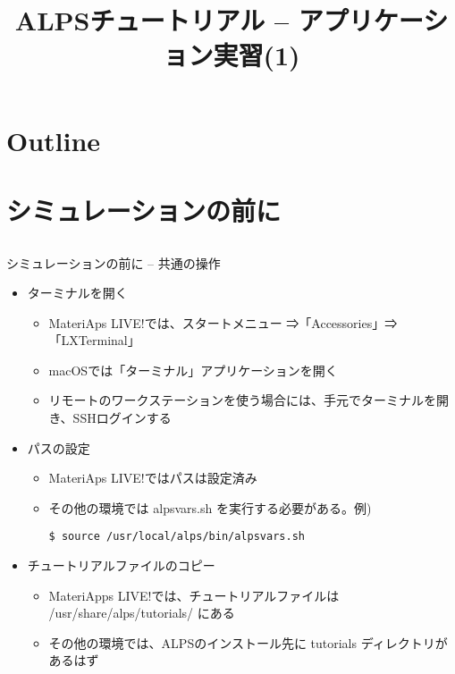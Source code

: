 
\title{ALPSチュートリアル -- アプリケーション実習(1)}




\begin{frame}
  \titlepage
\end{frame}

\section*{Outline}
\begin{frame}[t,fragile]
   \tableofcontents
\end{frame}

\section{シミュレーションの前に}
\subsection*{\redb\whiteb\greenm}

\begin{frame}[t,fragile]{シミュレーションの前に -- 共通の操作}
  \begin{itemize}
  \item ターミナルを開く
    \begin{itemize}
    \item \alert{MateriAps LIVE!では、スタートメニュー ⇒「Accessories」⇒「LXTerminal」}
    \item macOSでは「ターミナル」アプリケーションを開く
    \item リモートのワークステーションを使う場合には、手元でターミナルを開き、SSHログインする
    \end{itemize}

  \item パスの設定
    \begin{itemize}
    \item \alert{MateriAps LIVE!ではパスは設定済み}
    \item その他の環境では alpsvars.sh を実行する必要がある。例)
\begin{lstlisting}
$ source /usr/local/alps/bin/alpsvars.sh
\end{lstlisting}
    \end{itemize}
    
  \item チュートリアルファイルのコピー
    \begin{itemize}
    \item \alert{MateriApps LIVE!では、チュートリアルファイルは /usr/share/alps/tutorials/ にある}
    \item その他の環境では、ALPSのインストール先に tutorials ディレクトリがあるはず
    \end{itemize}
  \end{itemize}
\end{frame}

